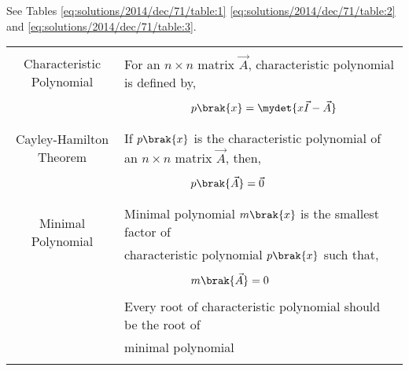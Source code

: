 See Tables \ref{eq:solutions/2014/dec/71/table:1}
\ref{eq:solutions/2014/dec/71/table:2} and 
\ref{eq:solutions/2014/dec/71/table:3}.

\begin{table*}[ht!]
\centering
\begin{tabular}{|c|l|}
    \hline
	\multirow{3}{*}{Characteristic Polynomial} 
	& \\
	& For an $n\times n$ matrix $\vec{A}$, characteristic polynomial is defined by,\\
	&\\
	& $\qquad\qquad\qquad p\brak{x}=\mydet{x\Vec{I}-\Vec{A}}$\\
	&\\
	\hline
	\multirow{3}{*}{Cayley-Hamilton Theorem}
    &\\
    & If $p\brak{x}$ is the characteristic polynomial of an $n\times n$ matrix $\vec{A}$, then,\\
    &\\
    &$\qquad \qquad \qquad p\brak{\vec{A}}=\vec{0}$\\
    &\\
    \hline
	\multirow{3}{*}{Minimal Polynomial} 
	&\\
	& Minimal polynomial $m\brak{x}$ is the smallest factor of\\
	&characteristic polynomial $p\brak{x}$ such that,\\
	&\\
	& $\qquad \qquad \qquad m\brak{\vec{A}}=0$\\
	& \\
	& Every root of characteristic polynomial should be the root of\\
	&minimal polynomial\\
	&\\
    \hline
\end{tabular}
\label{eq:solutions/2014/dec/71/table:1}
    \caption{Definitions}
\end{table*}

